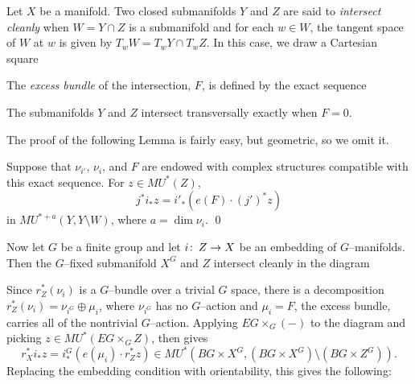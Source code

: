 \begin{definition}
Let $X$ be a manifold.  Two closed submanifolds $Y$ and $Z$ are said to \textit{intersect cleanly} when $W = Y \cap Z$ is a submanifold and for each $w \in W$, the tangent space of $W$ at $w$ is given by $T_w W = T_w Y \cap T_w Z$.  In this case, we draw a Cartesian square
\begin{center}
\end{center}
The \textit{excess bundle} of the intersection, $F$, is defined by the exact sequence
\begin{center}
\end{center}
\end{definition}

\begin{remark}
The submanifolds $Y$ and $Z$ intersect transversally exactly when $F = 0$.
\end{remark}

The proof of the following Lemma is fairly easy, but geometric, so we omit it.

\begin{lemma}\label{CleanIntersectionFormula}
Suppose that $\nu_{i'}$, $\nu_i$, and $F$ are endowed with complex structures compatible with this exact sequence. For $z \in MU^*(Z)$, \[j^* i_* z = i'_*(e(F) \cdot (j')^* z)\] in $MU^{*+a}(Y, Y \setminus W)$, where $a = \dim \nu_i$.  \qed
\end{lemma}

Now let $G$ be a finite group and let $i\colon\thinspace Z \to X$ be an embedding of $G$--manifolds. Then the $G$--fixed submanifold $X^G$ and $Z$ intersect cleanly in the diagram
\begin{center}
\end{center}
Since $r_Z^*(\nu_i)$ is a $G$--bundle over a trivial $G$ space, there is a decomposition $r_Z^*(\nu_i) = \nu_{i^G} \oplus \mu_i$, where $\nu_{i^G}$ has no $G$--action and $\mu_i = F$, the excess bundle, carries all of the nontrivial $G$--action.  Applying $EG \times_G (-)$ to the diagram and picking $z \in MU^*(EG \times_G Z)$,  then gives \[r_X^* i_* z = i^G_*(e(\mu_i) \cdot r_Z^* z) \in MU^*(BG \times X^G, (BG \times X^G) \setminus (BG \times Z^G)).\]  Replacing the embedding condition with orientability, this gives the following:

